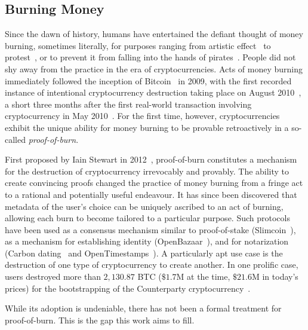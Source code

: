 \subsection{Burning Money}\label{section:introduction}
Since the dawn of history, humans have entertained the defiant thought of money
burning, sometimes literally, for purposes ranging from artistic effect~\cite{kfoundation} to
protest~\cite{armchair}, or to prevent it from falling into the hands of pirates~\cite{laertiuslives,ciceroinventione}.
People did not shy away from the practice in the era of cryptocurrencies.
Acts of money burning immediately followed the inception of Bitcoin~\cite{bitcoin} in 2009,
with the first recorded instance of intentional cryptocurrency destruction
taking place on August 2010~\cite{interesting-address}, a short three months after the first real-world
transaction involving cryptocurrency in May 2010~\cite{sok}. For the first time, however,
cryptocurrencies exhibit the unique ability for money burning to be provable
retroactively in a so-called \emph{proof-of-burn}.

First proposed by Iain
Stewart in 2012~\cite{stewart}, proof-of-burn constitutes a mechanism for the
destruction of cryptocurrency irrevocably and provably.
The ability to create convincing proofs changed the practice of money burning
from a fringe act to a rational and potentially useful endeavour. It has since
been discovered that metadata of the user's choice can be uniquely ascribed to
an act of burning, allowing each burn to become tailored to a particular
purpose. Such protocols have been used as a consensus mechanism similar to
proof-of-stake (Slimcoin~\cite{slimcoin}), as a mechanism for establishing
identity (OpenBazaar~\cite{reputation-pledges,zindros}), and for notarization (Carbon
dating~\cite{commitcoin} and
OpenTimestamps~\cite{opentimestamps}). A particularly apt use case is
the destruction of one type of cryptocurrency to create another. In one
prolific case, users destroyed more than $2{,}130.87$ BTC ($\$1.7$M at the
time, $\$21.6$M in today's prices) for the bootstrapping of the
Counterparty cryptocurrency~\cite{counterparty}.

While its adoption is undeniable, there has not been a formal treatment for
proof-of-burn. This is the gap this work aims to fill.

